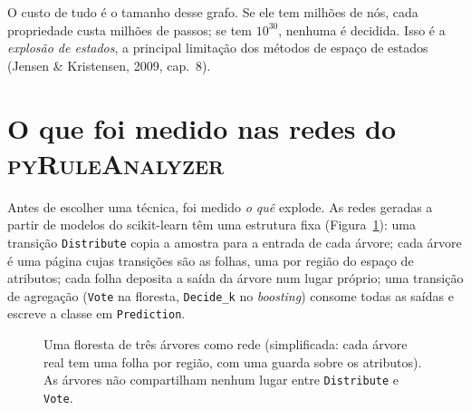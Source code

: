 \documentclass[11pt,a4paper]{report}
\newcommand{\pyra}{\textsc{pyRuleAnalyzer}}
\newcommand{\code}[1]{\texttt{\small #1}}
\theoremstyle{definition}
\begin{document}
O custo de tudo é o tamanho desse grafo. Se ele tem milhões de nós, cada
propriedade custa milhões de passos; se tem $10^{30}$, nenhuma é decidida.
Isso é a \emph{explosão de estados}, a principal limitação dos métodos de
espaço de estados (Jensen \& Kristensen, 2009, cap.~8).

\section{O que foi medido nas redes do \pyra{}}

Antes de escolher uma técnica, foi medido \emph{o quê} explode. As redes
geradas a partir de modelos do scikit-learn têm uma estrutura fixa
(Figura~\ref{fig:rede-rf}): uma transição \code{Distribute} copia a amostra
para a entrada de cada árvore; cada árvore é uma página cujas transições são as
folhas, uma por região do espaço de atributos; cada folha deposita a saída da
árvore num lugar próprio; uma transição de agregação (\code{Vote} na floresta,
\code{Decide\_k} no \emph{boosting}) consome todas as saídas e escreve a classe
em \code{Prediction}.

\begin{figure}[ht]
\centering
{}
\caption{Uma floresta de três árvores como rede (simplificada: cada árvore
real tem uma folha por região, com uma guarda sobre os atributos). As árvores
não compartilham nenhum lugar entre \code{Distribute} e \code{Vote}.}
\label{fig:rede-rf}
\end{figure}
\end{document}
